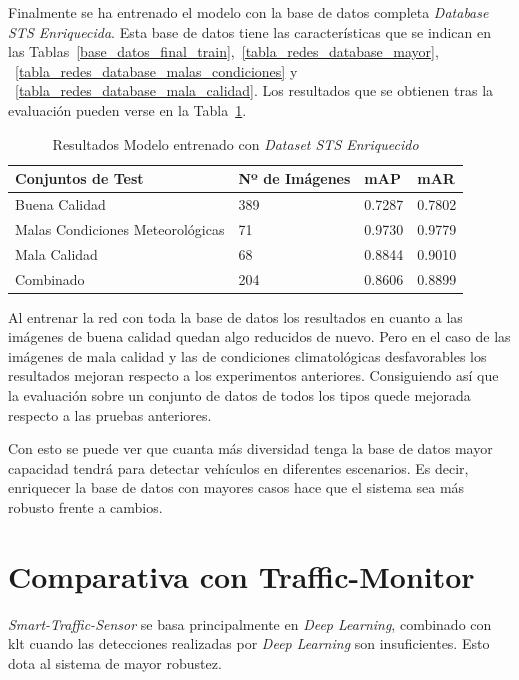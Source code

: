 Finalmente se ha entrenado el modelo con la base de datos completa \textit{Database STS Enriquecida}. Esta base de datos tiene las características que se indican en las Tablas~\ref{base_datos_final_train},~\ref{tabla_redes_database_mayor}, ~\ref{tabla_redes_database_malas_condiciones} y ~\ref{tabla_redes_database_mala_calidad}. Los resultados que se obtienen tras la evaluación pueden verse en la Tabla~\ref{resultados_test_todas_img}.

\begin{table}[H] 
\begin{center}
\begin{tabular}{|l|l|l|l|}
\hline
 Conjuntos de Test & Nº de Imágenes & mAP & mAR  \\ 
\hline \hline
Buena Calidad & 389 & 0.7287 & 0.7802 \\ \hline
Malas Condiciones Meteorológicas & 71 & 0.9730 & 0.9779 \\ \hline
Mala Calidad  & 68 & 0.8844 & 0.9010\\ \hline
Combinado & 204 & 0.8606 & 0.8899\\ \hline
\end{tabular}
\caption{Resultados Modelo entrenado con \textit{Dataset STS Enriquecido}}
\label{resultados_test_todas_img}
\end{center}
\end{table}

Al entrenar la red con toda la base de datos los resultados en cuanto a las imágenes de buena calidad quedan algo reducidos de nuevo. Pero en el caso de las imágenes de mala calidad y las de condiciones climatológicas desfavorables los resultados mejoran respecto  a los experimentos anteriores. Consiguiendo así que la evaluación sobre un conjunto de datos de todos los tipos quede mejorada respecto a las pruebas anteriores. 

Con esto se puede ver que cuanta más diversidad tenga la base de datos mayor capacidad tendrá para detectar vehículos en diferentes escenarios. Es decir, enriquecer la base de datos con mayores casos hace que el sistema sea más robusto frente a cambios. 

\section{Comparativa con Traffic-Monitor}

\textit{Smart-Traffic-Sensor} se basa principalmente en \textit{Deep Learning}, combinado con \acrshort{klt} cuando las detecciones realizadas por \textit{Deep Learning} son insuficientes. Esto dota al sistema de mayor robustez. 

